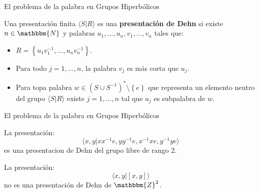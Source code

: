 \documentclass[xcolor=dvipsnames]{beamer}
\theoremstyle{largebreak}
\newcommand{\bbm}[1]{\ensuremath{\mathbbm{#1}}}
\newcommand{\gen}[1]{\ensuremath{\langle#1\rangle}}
\begin{document}
\begin{frame}{El problema de la palabra en Grupos Hiperbólicos}
    \begin{mydef}
        Una presentación finita $\gen{S|R}$ es una \textbf{presentación de Dehn} si existe $n\in\bbm{N}$ y palabras $u_1,...,u_n,v_1,...,v_n$ tales que:
        \begin{itemize}
            \item $R=\left\{u_1v_1^{-1},...,u_nv_n^{-1} \right\}$.
            \item Para todo $j=1,...,n$, la palabra $v_j$ es más corta que $u_j$.
            \item Para topa palabra $w\in(S\cup S^{-1})^*\setminus\left\{e\right\}$ que representa un elemento neutro del grupo $\gen{S|R}$ existe $j=1,...,n$ tal que $u_j$ es subpalabra de $w$.
        \end{itemize}
    \end{mydef}
\end{frame}

\begin{frame}{El problema de la palabra en Grupos Hiperbólicos}
    \begin{exa}
        La presentación:
        \begin{equation*}
            \gen{x,y|xx^{-1}e,yy^{-1}e,x^{-1}xe,y^{-1}ye}
        \end{equation*}
        es una presentacion de Dehn del grupo libre de rango 2.
    \end{exa}

    \pause

    \begin{exa}
        La presentación:
        \begin{equation*}
            \gen{x,y|[x,y]}
        \end{equation*}
        no es una presentación de Dehn de $\bbm{Z}^2$.
    \end{exa}
\end{frame}
\end{document}
